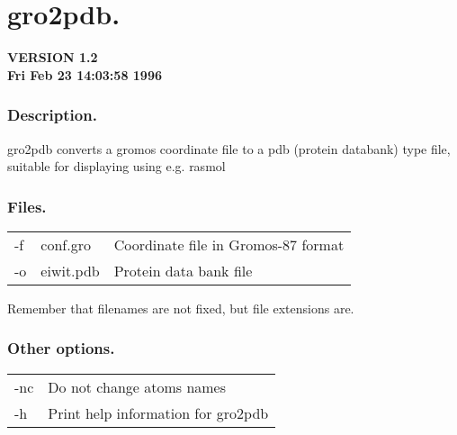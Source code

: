 \newpage
\section{gro2pdb.}
{\bf VERSION 1.2\\Fri Feb 23 14:03:58 1996
}

\subsubsection*{Description.}
gro2pdb converts a gromos coordinate file to a pdb (protein databank)
type file, suitable for displaying using e.g. rasmol
\subsubsection*{Files.}
\begin{table}[ht]
\begin{tabularx}{\linewidth}{llX}
-f & conf.gro & Coordinate file in Gromos-87 format \\
-o & eiwit.pdb & Protein data bank file \\
\end{tabularx}
\end{table}
Remember that filenames are not fixed, but 
file extensions are.
\subsubsection*{Other options.}
\begin{table}[ht]
\begin{tabularx}{\linewidth}{lX}
-nc & Do not change atoms names\\
-h & Print help information for gro2pdb\\
\end{tabularx}
\end{table}
